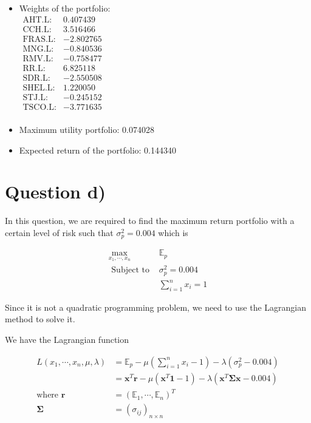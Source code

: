 \documentclass[12pt]{article}
\begin{document}
\begin{itemize}
    \item Weights of the portfolio: \\ \(
          \begin{array}{rr}
              \text{AHT.L:}  & 0.407439  \\
              \text{CCH.L:}  & 3.516466  \\
              \text{FRAS.L:} & -2.802765 \\
              \text{MNG.L:}  & -0.840536 \\
              \text{RMV.L:}  & -0.758477 \\
              \text{RR.L:}   & 6.825118  \\
              \text{SDR.L:}  & -2.550508 \\
              \text{SHEL.L:} & 1.220050  \\
              \text{STJ.L:}  & -0.245152 \\
              \text{TSCO.L:} & -3.771635 \\
          \end{array}
          \)
    \item Maximum utility portfolio: 0.074028
    \item Expected return of the portfolio: 0.144340
\end{itemize}

\section{Question d)}

In this question, we are required to find the maximum return portfolio with a
certain level of risk such that
\(\sigma^2_p = 0.004\) which is

\[\begin{aligned}
        \max _{x_1, \cdots, x_n} & \mathbb{E}_p       \\
        \text { Subject to }     & \sigma^2_p = 0.004 \\
                                 & \sum_{i=1}^n x_i=1
    \end{aligned}\]

Since it is not a quadratic programming problem, we need to use the Lagrangian
method to solve it.

We have the Lagrangian function

\[
    \begin{aligned}
        L(x_1, \cdots, x_n, \mu, \lambda) & =\mathbb{E}_p-\mu\left(\sum_{i=1}^n
        x_i-1\right)-\lambda\left(\sigma^2_p-0.004\right)                                   \\
                                          & =\mathbf{x}^T\mathbf{r} -\mu \left(\mathbf{x}^T
        \mathbf{1}-1\right)-\lambda
        \left(\mathbf{x}^T\mathbf{\Sigma}\mathbf{x}-0.004\right)                            \\
        \text{where } \mathbf{r}          & =\left(\mathbb{E}_1, \cdots,
        \mathbb{E}_n\right)^T                                                               \\
        \mathbf{\Sigma}                   & =\left(\sigma_{i j}\right)_{n \times n}
    \end{aligned}
\]
\end{document}

